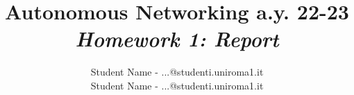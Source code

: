 \documentclass{article}
\title{Autonomous Networking a.y. 22-23\\ \textit{Homework 1: Report}}
\author{
Student Name - ...@studenti.uniroma1.it\\ 
Student Name - ...@studenti.uniroma1.it
}
\begin{document}
\maketitle

\sloppy


%
\end{document}
